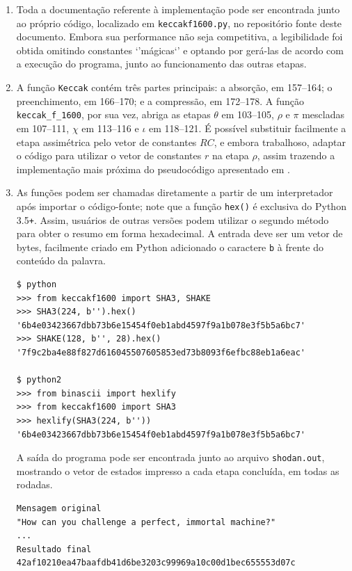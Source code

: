 \documentclass{article}
\begin{document}
\begin{enumerate}[label=(\alph*)]

\item Toda a documentação referente à implementação pode ser encontrada junto
ao próprio código, localizado em \texttt{keccakf1600.py}, no repositório fonte
deste documento. Embora sua performance não seja competitiva, a legibilidade
foi obtida omitindo constantes `'mágicas`' e optando por gerá-las de acordo
com a execução do programa, junto ao funcionamento das outras etapas.

\item A função \texttt{Keccak} contém três partes principais: a absorção, em
157--164; o preenchimento, em 166--170; e a compressão, em 172--178. A
função \texttt{keccak\_f\_1600}, por sua vez, abriga as etapas $\theta$ em
103--105, $\rho$ e $\pi$ mescladas em 107--111, $\chi$ em 113--116 e $\iota$ em
118--121. É possível substituir facilmente a etapa assimétrica pelo vetor de
constantes $RC$, e embora trabalhoso, adaptar o código para utilizar o vetor de
constantes $r$ na etapa $\rho$, assim trazendo a implementação mais próxima do
pseudocódigo apresentado em \cite{KeccakImplementation}.

\item As funções podem ser chamadas diretamente a partir de um interpretador
após importar o código-fonte; note que a função \texttt{hex()} é exclusiva do
Python 3.5\texttt{+}. Assim, usuários de outras versões podem utilizar o
segundo método para obter o resumo em forma hexadecimal. A entrada deve ser
um vetor de bytes, facilmente criado em Python adicionado o caractere
\texttt{b} à frente do conteúdo da palavra.

\begin{verbatim}
$ python
>>> from keccakf1600 import SHA3, SHAKE
>>> SHA3(224, b'').hex()
'6b4e03423667dbb73b6e15454f0eb1abd4597f9a1b078e3f5b5a6bc7'
>>> SHAKE(128, b'', 28).hex()
'7f9c2ba4e88f827d616045507605853ed73b8093f6efbc88eb1a6eac'

$ python2
>>> from binascii import hexlify
>>> from keccakf1600 import SHA3
>>> hexlify(SHA3(224, b''))
'6b4e03423667dbb73b6e15454f0eb1abd4597f9a1b078e3f5b5a6bc7'
\end{verbatim}

A saída do programa pode ser encontrada junto ao arquivo \texttt{shodan.out},
mostrando o vetor de estados impresso a cada etapa concluída, em todas as
rodadas.

\begin{verbatim}
Mensagem original
"How can you challenge a perfect, immortal machine?"
...
Resultado final
42af10210ea47baafdb41d6be3203c99969a10c00d1bec655553d07c
\end{verbatim}

\end{enumerate}

\newpage



\end{document}
